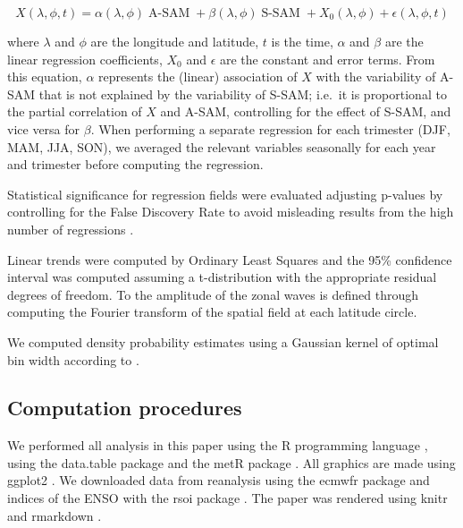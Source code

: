 \documentclass[smallextended]{svjour3}       %
\begin{document}
\[
X(\lambda, \phi, t) = \alpha(\lambda, \phi) \operatorname{A-SAM} + \beta(\lambda, \phi) \operatorname{S-SAM} + X_0(\lambda, \phi) +  \epsilon(\lambda, \phi, t)
\]

where \(\lambda\) and \(\phi\) are the longitude and latitude, \(t\) is the time, \(\alpha\) and \(\beta\) are the linear regression coefficients, \(X_0\) and \(\epsilon\) are the constant and error terms.
From this equation, \(\alpha\) represents the (linear) association of \(X\) with the variability of A\nobreakdash-SAM that is not explained by the variability of S\nobreakdash-SAM; i.e.~it is proportional to the partial correlation of \(X\) and A\nobreakdash-SAM, controlling for the effect of S\nobreakdash-SAM, and vice versa for \(\beta\).
When performing a separate regression for each trimester (DJF, MAM, JJA, SON), we averaged the relevant variables seasonally for each year and trimester before computing the regression.

Statistical significance for regression fields were evaluated adjusting p-values by controlling for the False Discovery Rate \citep{benjamini1995, wilks2016} to avoid misleading results from the high number of regressions \citep{walker1914, katz1991}.

Linear trends were computed by Ordinary Least Squares and the 95\% confidence interval was computed assuming a t-distribution with the appropriate residual degrees of freedom.
To the amplitude of the zonal waves is defined through computing the Fourier transform of the spatial field at each latitude circle.

We computed density probability estimates using a Gaussian kernel of optimal bin width according to \citet{sheather1991}.

\hypertarget{computation-procedures}{%
\subsection{Computation procedures}\label{computation-procedures}}

We performed all analysis in this paper using the R programming language \citep{rcoreteam2020}, using the data.table package \citep{dowle2020} and the metR package \citep{campitelli2020}.
All graphics are made using ggplot2 \citep{wickham2009}.
We downloaded data from reanalysis using the ecmwfr package \citep{hufkens2020} and indices of the ENSO with the rsoi package \citep{albers2020}.
The paper was rendered using knitr and rmarkdown \citep{xie2015, allaire2019}.
\end{document}
